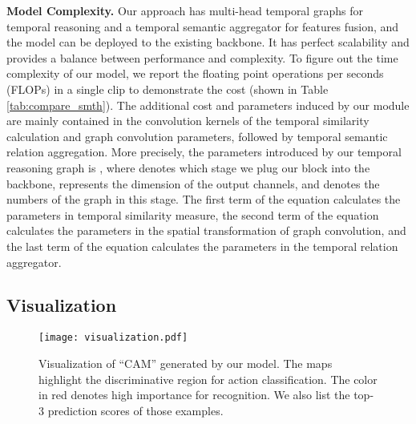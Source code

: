 \documentclass[conference,compsoc]{IEEEtran}
\begin{document}
    \noindent\textbf{Model Complexity.}
    Our approach has multi-head temporal graphs for temporal reasoning and a temporal semantic aggregator for features fusion, and the model can be deployed to the existing backbone. It has perfect scalability and provides a balance between performance and complexity. To figure out the time complexity of our model, we report the floating point operations per seconds (FLOPs) in a single clip to demonstrate the cost (shown in Table \ref{tab:compare_smth}). The additional cost and parameters induced by our module are mainly contained in the convolution kernels of the temporal similarity calculation and graph convolution parameters, followed by temporal semantic relation aggregation. More precisely, the parameters introduced by our temporal reasoning graph is , where  denotes which stage we plug our block into the backbone,  represents the dimension of the output channels, and  denotes the numbers of the graph in this stage. The first term of the equation calculates the parameters in temporal similarity measure, the second term of the equation calculates the parameters in the spatial transformation of graph convolution, and the last term of the equation calculates the parameters in the temporal relation aggregator.
    
\subsection{Visualization}

    \begin{figure*}[h]
    \centering
        \texttt{[image: visualization.pdf]}
        \caption{Visualization of ``CAM'' \cite{zhou2016learning} generated by our model. The maps highlight the discriminative region for action classification. The color in red denotes high importance for recognition. We also list the top-3 prediction scores of those examples.}
        \label{fig:cam}
    \end{figure*}
\end{document}

